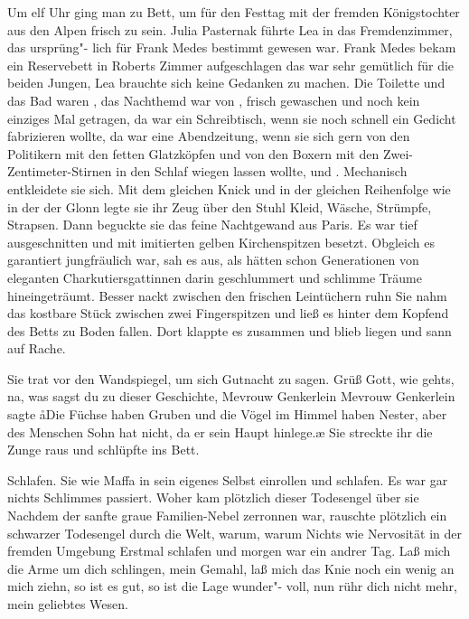 Um elf Uhr ging man zu Bett, um für den Festtag mit der
fremden Königstochter aus den Alpen frisch zu sein. Julia
Pasternak führte Lea in das Fremdenzimmer, das ursprüng"-%
lich für Frank Medes bestimmt gewesen war. Frank Medes
bekam ein Reservebett in Roberts Zimmer aufgeschlagen\semi{}
das war sehr gemütlich für die beiden Jungen, Lea brauchte
sich keine Gedanken zu machen. Die Toilette und das Bad
waren , das Nachthemd war von , frisch
gewaschen und noch kein einziges Mal getragen, da war ein
Schreibtisch, wenn sie noch schnell ein Gedicht fabrizieren
wollte, da war eine Abendzeitung, wenn sie sich gern von den
Politikern mit den fetten Glatzköpfen und von den Boxern
mit den Zwei-Zentimeter-Stirnen in den Schlaf wiegen
lassen wollte, und .
\abstand{}
Mechanisch entkleidete sie sich. Mit dem gleichen Knick und
in der gleichen Reihenfolge wie in der der Glonn legte sie ihr Zeug
über den Stuhl\dopp{} Kleid, Wäsche, Strümpfe, Strapsen. Dann
beguckte sie das feine Nachtgewand aus Paris. Es war tief
ausgeschnitten und mit imitierten gelben Kirchenspitzen
besetzt. Obgleich es garantiert jungfräulich war, sah es aus, als
hätten schon Generationen von eleganten Charkutiersgattinnen
darin geschlummert und schlimme Träume hineingeträumt.
Besser nackt zwischen den frischen Leintüchern ruhn\ausr{} Sie nahm
das kostbare Stück zwischen zwei Fingerspitzen und ließ es
hinter dem Kopfend des Betts zu Boden fallen. Dort klappte
es zusammen und blieb liegen und sann auf Rache.

Sie trat vor den Wandspiegel, um sich Gutnacht zu sagen.
Grüß Gott, wie gehts, na, was sagst du zu dieser Geschichte,
Mevrouw Genkerlein\frag{} Mevrouw Genkerlein sagte\dopp{} \aa{}Die
Füchse haben Gruben und die Vögel im Himmel haben Nester,
aber des Menschen Sohn hat nicht, da er sein Haupt hinlege.\ae{}\eingriff{eS86-1}{hinlege.\ae{} ] hinlege\ae{}.}
Sie streckte ihr die Zunge raus und schlüpfte ins Bett.

Schlafen. Sie wie Maffa in sein eigenes Selbst einrollen und
schlafen. Es war gar nichts Schlimmes passiert. Woher kam
plötzlich dieser Todesengel über sie\frag{} Nachdem der sanfte
graue Familien-Nebel zerronnen war, rauschte plötzlich ein
schwarzer Todesengel durch die Welt, warum, warum\frag{}
Nichts wie Nervosität in der fremden Umgebung\ausr{} Erstmal
schlafen und morgen war ein andrer Tag. Laß mich die Arme
um dich schlingen, mein Gemahl, laß mich das Knie noch ein
wenig an mich ziehn, so ist es gut, so ist die Lage wunder"-%
voll, nun rühr dich nicht mehr, mein geliebtes Wesen.

